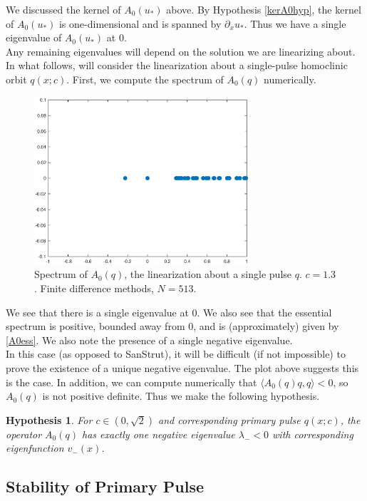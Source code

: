 \documentclass[12pt]{article}
\newtheorem{hypothesis}{Hypothesis}
\begin{document}
We discussed the kernel of $A_0(u_*)$ above. By Hypothesis \ref{kerA0hyp}, the kernel of $A_0(u_*)$ is one-dimensional and is spanned by $\partial_x u_*$. Thus we have a single eigenvalue of $A_0(u_*)$ at 0. \\

Any remaining eigenvalues will depend on the solution we are linearizing about. In what follows, will consider the linearization about a single-pulse homoclinic orbit $q(x; c)$. First, we compute the spectrum of $A_0(q)$ numerically.

\begin{figure}[H]
\centering
\includegraphics[width=8cm]{specA0.eps}
\caption{Spectrum of $A_0(q)$, the linearization about a single pulse $q$. $c = 1.3$. Finite difference methods, $N = 513$.}
\end{figure}

We see that there is a single eigenvalue at 0. We also see that the essential spectrum is positive, bounded away from 0, and is (approximately) given by \eqref{A0ess}. We also note the presence of a single negative eigenvalue.\\

In this case (as opposed to SanStrut), it will be difficult (if not impossible) to prove the existence of a unique negative eigenvalue. The plot above suggests this is the case. In addition, we can compute numerically that $\langle A_0(q) q, q \rangle < 0$, so $A_0(q)$ is not positive definite. Thus we make the following hypothesis.

\begin{hypothesis}\label{A0neg}
For $c \in (0, \sqrt{2})$ and corresponding primary pulse $q(x; c)$, the operator $A_0(q)$ has exactly one negative eigenvalue $\lambda_- < 0$ with corresponding eigenfunction $v_-(x)$.
\end{hypothesis}

\subsection{Stability of Primary Pulse}
\end{document}
